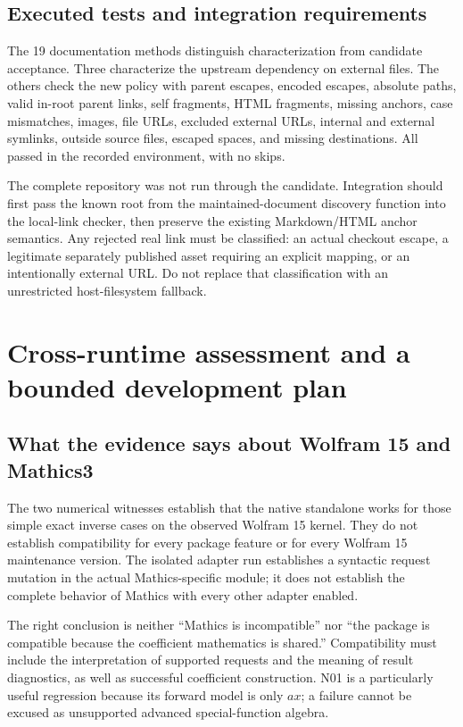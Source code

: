 \documentclass[11pt,letterpaper]{article}
\begin{document}
\subsection{Executed tests and integration requirements}

The 19 documentation methods distinguish characterization from candidate
acceptance. Three characterize the upstream dependency on external files.
The others check the new policy with parent escapes, encoded escapes, absolute
paths, valid in-root parent links, self fragments, HTML fragments, missing
anchors, case mismatches, images, file URLs, excluded external URLs, internal
and external symlinks, outside source files, escaped spaces, and missing
destinations. All passed in the recorded environment, with no skips.

The complete repository was not run through the candidate. Integration should
first pass the known root from the maintained-document discovery function into
the local-link checker, then preserve the existing Markdown/HTML anchor
semantics. Any rejected real link must be classified: an actual checkout
escape, a legitimate separately published asset requiring an explicit mapping,
or an intentionally external URL. Do not replace that classification with an
unrestricted host-filesystem fallback.

\section{Cross-runtime assessment and a bounded development plan}
\subsection{What the evidence says about Wolfram 15 and Mathics3}

The two numerical witnesses establish that the native standalone works for
those simple exact inverse cases on the observed Wolfram 15 kernel. They do
not establish compatibility for every package feature or for every Wolfram 15
maintenance version. The isolated adapter run establishes a syntactic request
mutation in the actual Mathics-specific module; it does not establish the
complete behavior of Mathics with every other adapter enabled.

The right conclusion is neither ``Mathics is incompatible'' nor ``the package
is compatible because the coefficient mathematics is shared.'' Compatibility
must include the interpretation of supported requests and the meaning of
result diagnostics, as well as successful coefficient construction. N01 is a
particularly useful regression because its forward model is only $a x$; a
failure cannot be excused as unsupported advanced special-function algebra.
\end{document}
